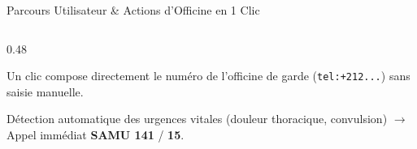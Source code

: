 \documentclass[aspectratio=169,10pt]{beamer}
\begin{document}
\begin{frame}{Parcours Utilisateur \& Actions d'Officine en 1 Clic}
\begin{columns}[T]
\begin{column}{0.48\textwidth}
            \begin{tcolorbox}[colback=white,colframe=accent,arc=2mm,title={\footnotesize \faPhone~2. Appel Téléphonique Direct},coltitle=white]
                \scriptsize
                Un clic compose directement le numéro de l'officine de garde (\texttt{tel:+212...}) sans saisie manuelle.
            \end{tcolorbox}

            \begin{tcolorbox}[colback=white,colframe=danger,arc=2mm,title={\footnotesize \faShield*~3. Sécurité Médicale \& Urgences},coltitle=white]
                \scriptsize
                Détection automatique des urgences vitales (douleur thoracique, convulsion) $\rightarrow$ Appel immédiat \textbf{SAMU 141} / \textbf{15}.
            \end{tcolorbox}
        \end{column}
    \end{columns}
\end{frame}
\end{document}
